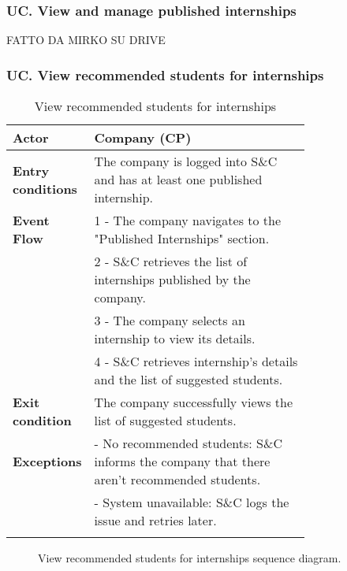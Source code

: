 \subsubsection*{UC\cuc . View and manage published internships}
FATTO DA MIRKO SU DRIVE

\subsubsection*{UC\cuc . View recommended students for internships}
\begin{center}
    \begin{longtable}{|l|p{0.75\linewidth}|}
        \hline
        \textbf{Actor}            & Company (CP)\\
        \hline
        \textbf{Entry conditions} & The company is logged into S\&C and has at least one published internship.\\
        \hline
        \textbf{Event Flow}     & 1 - The company navigates to the "Published                              Internships" section. \\
                                & 2 - S\&C retrieves the list of internships published by the company. \\
                                & 3 - The company selects an internship to view its details. \\
                                & 4 - S\&C retrieves internship's details and the list of suggested students.\\
        \hline
        \textbf{Exit condition}     & The company successfully views the list of                                suggested students.\\       
        \hline
        \textbf{Exceptions}     & - No recommended students: S\&C informs the company that there aren't recommended students. \\
                                & - System unavailable: S\&C logs the issue and retries later. \\
        \hline
        \caption{View recommended students for internships}
        \label{tab: view_recommended_students_for_internships_usecase}
    \end{longtable}
\end{center}

\begin{figure}[H]
    \begin{center}
        
        \caption{View recommended students for internships sequence diagram.}
        \label{fig:view_recommended_students_seqd}%
    \end{center}
\end{figure}


